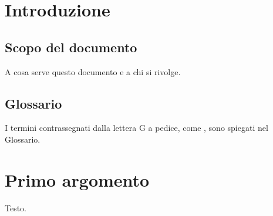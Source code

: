 \section{Introduzione}

\subsection{Scopo del documento}
A cosa serve questo documento e a chi si rivolge.

\subsection{Glossario}
I termini contrassegnati dalla lettera G a pedice, come ,
sono spiegati nel Glossario.

\section{Primo argomento}
Testo.

% 


